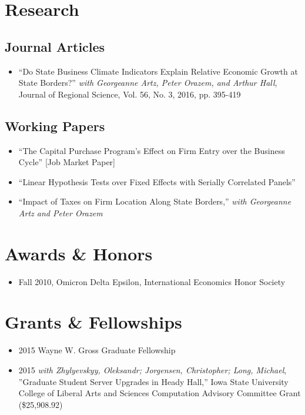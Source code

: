\documentclass[letterpaper]{article}
\begin{document}
\section*{Research}

\subsection*{Journal Articles}

\begin{itemize}
\item ``Do State Business Climate Indicators Explain Relative Economic Growth at State Borders?'' \textit{with Georgeanne Artz, Peter Orazem, and Arthur Hall}, Journal of Regional Science, Vol. 56, No. 3, 2016, pp. 395-419
\end{itemize}

\subsection*{Working Papers}

\begin{itemize}
\item ``The Capital Purchase Program's Effect on Firm Entry over the Business Cycle'' [Job Market Paper]
\item ``Linear Hypothesis Tests over Fixed Effects with Serially Correlated Panels''
\item ``Impact of Taxes on Firm Location Along State Borders,'' \textit{with Georgeanne Artz and Peter Orazem}
\end{itemize}

\section*{Awards \& Honors}

\begin{itemize}
  \item Fall 2010, Omicron Delta Epsilon, International Economics Honor Society
\end{itemize}

\section*{Grants \& Fellowships}


\begin{itemize}
\item 2015 Wayne W. Gross Graduate Fellowship
\item 2015 \textit{with Zhylyevskyy, Oleksandr; Jorgensen, Christopher; Long, Michael}, ''Graduate Student Server Upgrades in Heady Hall,'' Iowa State University College of Liberal Arts and Sciences Computation Advisory Committee Grant (\$25,908.92)
\end{itemize}
\end{document}
